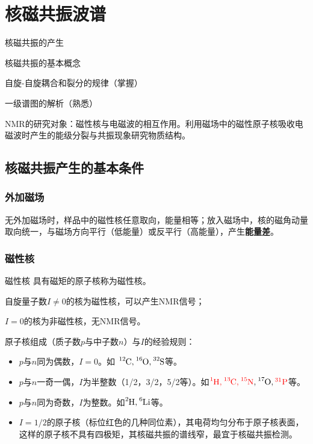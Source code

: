 \chapter{核磁共振波谱}

\begin{introduction}
	\item 核磁共振的产生
	\item 核磁共振的基本概念
	\item 自旋-自旋耦合和裂分的规律（掌握）
	\item 一级谱图的解析（熟悉）
\end{introduction}

NMR的研究对象：磁性核与电磁波的相互作用。利用磁场中的磁性原子核吸收电磁波时产生的能级分裂与共振现象研究物质结构。

\section{核磁共振产生的基本条件}
\subsection{外加磁场}
无外加磁场时，样品中的磁性核任意取向，能量相等；放入磁场中，核的磁角动量取向统一，与磁场方向平行（低能量）或反平行（高能量），产生\textbf{能量差}。

\subsection{磁性核}
\begin{definition*}{磁性核}{}
	具有磁矩的原子核称为磁性核。
	
	自旋量子数$I\neq 0$的核为磁性核，可以产生NMR信号；
	
	$I = 0$的核为非磁性核，无NMR信号。
\end{definition*}

原子核组成（质子数$p$与中子数$n$）与$I$的经验规则：
\begin{itemize}
	\item $p$与$n$同为偶数，$I = 0$。如 $\ce{^{12}C, ^{16}O, ^{32}S}$等。
	\item $p$与$n$一奇一偶，$I$为半整数（1/2，3/2，5/2等）。如$\textcolor{red}{\ce{^{1}H, ^{13}C, ^{15}N}},\ce{^{17}O, \textcolor{red}{^{31}P}}$等。
	\item $p$与$n$同为奇数，$I$为整数。如$\ce{^{2}H, ^{6}Li}$等。
	\item $I=1/2$的原子核（标位红色的几种同位素），其电荷均匀分布于原子核表面，这样的原子核不具有四极矩，其核磁共振的谱线窄，最宜于核磁共振检测。
\end{itemize}

